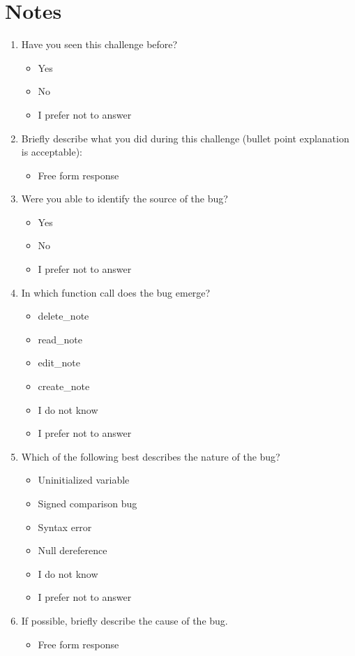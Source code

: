 \section{Notes}
\begin{enumerate}
    \item Have you seen this challenge before?
    \begin{itemize}
        \item Yes
        \item No
        \item I prefer not to answer
    \end{itemize}
    \item Briefly describe what you did during this challenge (bullet point explanation is acceptable):
    \begin{itemize}
        \item Free form response
    \end{itemize}
    \item Were you able to identify the source of the bug?
    \begin{itemize}
        \item Yes
        \item No
        \item I prefer not to answer
    \end{itemize}
    \item In which function call does the bug emerge?
    \begin{itemize}
        \item delete\_note
        \item read\_note
        \item edit\_note
        \item create\_note
        \item I do not know
        \item I prefer not to answer
    \end{itemize}
    \item Which of the following best describes the nature of the bug?
    \begin{itemize}
        \item Uninitialized variable
        \item Signed comparison bug
        \item Syntax error
        \item Null dereference
        \item I do not know
        \item I prefer not to answer
    \end{itemize}
    \item If possible, briefly describe the cause of the bug.
    \begin{itemize}
        \item Free form response
    \end{itemize}
\end{enumerate}

